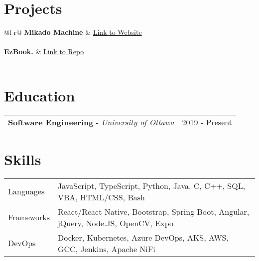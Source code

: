\documentclass[a4paper,11pt]{article}
\begin{document}
\section{Projects}
\begin{tabularx}{\linewidth}{ @{}l r@{} }
\textbf{Mikado Machine} & \hfill \href{https://mikadomachine.uottawaesports.ca/}{Link to Website} \\[3.75pt]
  \\
\textbf{EzBook.} & \hfill \href{https://github.com/Daanish-Khan/EzBook}{Link to Repo} \\[3.75pt]
  \\
\end{tabularx}

\section{Education}
\begin{tabularx}{\linewidth}{@{}l X@{}}	
\textbf{Software Engineering} - \textit{University of Ottawa} & \hfill 2019 - Present \\[3.75pt]
\end{tabularx}

\section{Skills}
\begin{tabularx}{\linewidth}{@{}l X@{}}
Languages &  \normalsize{JavaScript, TypeScript, Python, Java, C, C++, SQL, VBA, HTML/CSS, Bash}\\
Frameworks  &  \normalsize{React/React Native, Bootstrap, Spring Boot, Angular, jQuery, Node.JS, OpenCV, Expo}\\ 
DevOps  &  \normalsize{Docker, Kubernetes, Azure DevOps, AKS, AWS, GCC, Jenkins, Apache NiFi}\\
\end{tabularx}
\vfill
\end{document}
